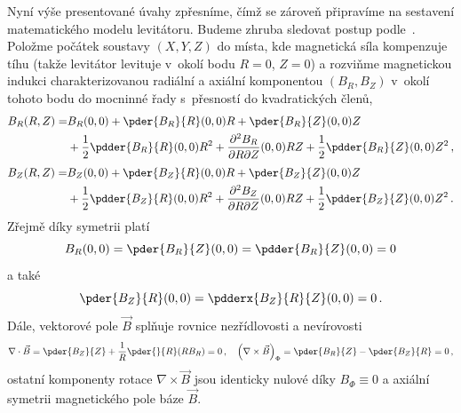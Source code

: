 Nyní výše presentované úvahy zpřesníme, čímž se zároveň připravíme na
sestavení matematického modelu levitátoru. Budeme zhruba sledovat postup
podle~\cite{Hab:1999:MgrDP:ProbUlFyzPrakt}. Položme počátek soustavy $(X,Y,Z)$
do místa, kde magnetická síla kompenzuje tíhu (takže levitátor levituje
v~okolí bodu $R=0$, $Z=0$) a rozviňme magnetickou indukci charakterizovanou
radiální a axiální komponentou $(B_{R}, B_{Z})$ v~okolí tohoto bodu do
mocninné řady s~přesností do kvadratických členů,
\begin{align}
  B_{R}(R,Z)=&B_{R}(0,0)+\pder{B_{R}}{R}(0,0)R+\pder{B_{R}}{Z}(0,0)Z\notag\\
  &+\frac{1}{2}\pdder{B_{R}}{R}(0,0)R^{2}+\frac{\partial^{2} B_{R}}
  {\partial{R}\partial{Z}}(0,0)RZ
  +\frac{1}{2}\pdder{B_{R}}{Z}(0,0)Z^{2}\,,                         \label{r3_11}
\end{align}
\begin{align}
  B_{Z}(R,Z)=&B_{Z}(0,0)+\pder{B_{Z}}{R}(0,0)R+\pder{B_{Z}}{Z}(0,0)Z\notag\\
  &+\frac{1}{2}\pdder{B_{Z}}{R}(0,0)R^{2}+\frac{\partial^{2} B_{Z}}
  {\partial{R}\partial{Z}}(0,0)RZ+\frac{1}{2}
  \pdder{B_{Z}}{Z}(0,0)Z^{2}\,.                                     \label{r3_12}
\end{align}
Zřejmě díky symetrii platí
\begin{equation}
  B_{R}(0,0)=\pder{B_{R}}{Z}(0,0)= \pdder{B_{R}}{Z}(0,0)=0         \label{axsym1}
\end{equation}
a také
\begin{equation}
  \pder{B_{Z}}{R}(0,0)=\pdderx{B_{Z}}{R}{Z}(0,0)=0\,.             \label{axsym2}
\end{equation}
Dále, vektorové pole $\vec{B}$ splňuje rovnice nezřídlovosti a nevírovosti
\begin{equation}
  \nabla\cdot\vec{B}=\pder{B_{Z}}{Z}+\frac{1}{R}\pder{}{R}(R B_{R})=0\,,\quad
  \left(\nabla\times\vec{B}\right)_{\Phi}=\pder{B_{R}}{Z}-\pder{B_{Z}}{R}=
  0\,,                                                             \label{r3_13}
\end{equation}
ostatní komponenty rotace $\nabla\times\vec{B}$ jsou identicky nulové díky
$B_{\Phi}\equiv 0$ a axiální symetrii magnetického pole báze $\vec{B}$.

